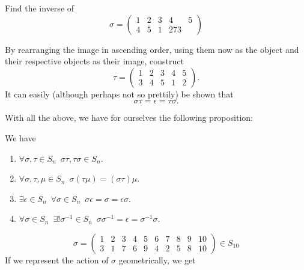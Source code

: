 \documentclass[notoc,notitlepage]{tufte-book}
\begin{document}
\begin{eg}
  \label{eg:inverse_permutation}
  Find the inverse of
  \begin{equation*}
    \sigma = \begin{pmatrix}
      1 & 2 & 3 & 4 & 5 \\
      4 & 5 & 1 & 2 7 3
    \end{pmatrix}
  \end{equation*}

  \begin{solution}
    By rearranging the image in ascending order, using them now as the object and their respective objects as their image, construct
    \begin{equation*}
      \tau = \begin{pmatrix}
        1 & 2 & 3 & 4 & 5 \\
        3 & 4 & 5 & 1 & 2
      \end{pmatrix}.
    \end{equation*}
    It can easily (although perhaps not so prettily) be shown that
    \begin{equation*}
      \sigma \tau = \epsilon = \tau \sigma.
    \end{equation*}
  \end{solution}
\end{eg}

With all the above, we have for ourselves the following proposition:

\begin{propo}\label{propo:properties_of_Sn}
  We have
  \begin{enumerate}
    \item $\forall \sigma, \tau \in S_n \enspace \sigma \tau, \tau \sigma \in S_n$.
    \item $\forall \sigma, \tau, \mu \in S_n \enspace \sigma (\tau \mu) = (\sigma \tau) \mu$.
    \item $\exists \epsilon \in S_n \enspace \forall \sigma \in S_n \enspace \sigma \epsilon = \sigma = \epsilon \sigma$.
    \item $\forall \sigma \in S_n \enspace \exists! \sigma^{-1} \in S_n \enspace \sigma \sigma^{-1} = \epsilon = \sigma^{-1} \sigma$.
  \end{enumerate}
\end{propo}

\begin{equation*}
  \sigma = \begin{pmatrix}
    1 & 2 & 3 & 4 & 5 & 6 & 7 & 8 & 9 & 10 \\
    3 & 1 & 7 & 6 & 9 & 4 & 2 & 5 & 8 & 10
  \end{pmatrix} \in S_{10}
\end{equation*}
If we represent the action of $\sigma$ geometrically, we get
\end{document}
